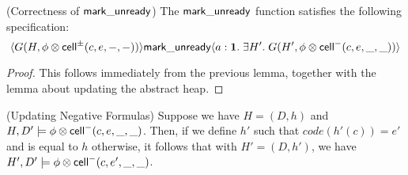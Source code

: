 \begin{lemma}{(Correctness of $\mathsf{mark\_unready}$)}
The $\mathsf{mark\_unready}$ function satisfies the following specification:   
\begin{displaymath}
\langle{G(H, \phi \otimes \mathsf{cell}^{\pm}({c}, {e}, {-}, {-}))}\rangle{\mathsf{mark\_unready}}\langle{a:\mathbf{1}}.\;{\exists H'.\;G(H', \phi \otimes \mathsf{cell}^{-}({c}, {e}, {\_}, {\_}))}\rangle
\end{displaymath}
\end{lemma}

\begin{proof}
  This follows immediately from the previous lemma, together with the lemma about updating the 
abstract heap. 
\end{proof}


\begin{lemma}{(Updating Negative Formulas)}
Suppose we have  $H = (D,h)$ and $H, D' \models \phi \otimes \mathsf{cell}^{-}({c}, {e}, {\_}, {\_})$. Then, if
we define $h'$ such that $\mathit{code}(h'(c)) = e'$ and is equal to $h$ otherwise, 
it follows that with $H' = (D,h')$, we have $H', D' \models \phi \otimes \mathsf{cell}^{-}({c}, {e'}, {\_}, {\_})$. 
\end{lemma}

